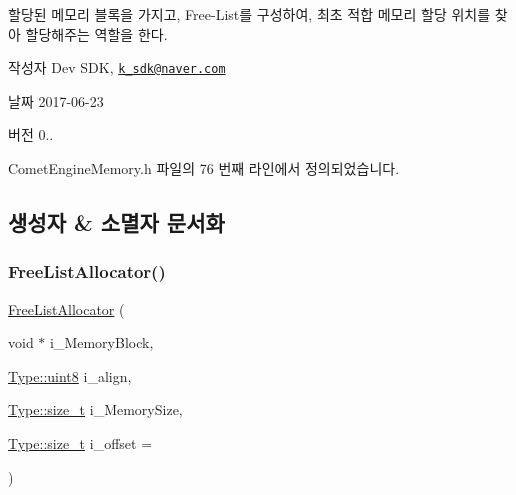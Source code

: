 할당된 메모리 블록을 가지고, Free-\/\+List를 구성하여, 최초 적합 메모리 할당 위치를 찾아 할당해주는 역할을 한다.

\begin{DoxyAuthor}{작성자}
Dev S\+DK, \href{mailto:k_sdk@naver.com}{\tt k\+\_\+sdk@naver.\+com} 
\end{DoxyAuthor}
\begin{DoxyDate}{날짜}
2017-\/06-\/23 
\end{DoxyDate}
\begin{DoxyVersion}{버전}
0.. 
\end{DoxyVersion}


Comet\+Engine\+Memory.\+h 파일의 76 번째 라인에서 정의되었습니다.



\subsection{생성자 \& 소멸자 문서화}
\mbox{\label{class_comet_engine_1_1_core_1_1_memory_1_1_free_list_allocator_ae13641cb77ff097ec23c1a6112b2e6c6}} 
\subsubsection{\texorpdfstring{Free\+List\+Allocator()}{FreeListAllocator()}}
{\footnotesize\ttfamily \hyperlink{class_comet_engine_1_1_core_1_1_memory_1_1_free_list_allocator}{Free\+List\+Allocator} (\begin{DoxyParamCaption}\item[{void $\ast$}]{i\+\_\+\+Memory\+Block,  }\item[{\hyperlink{namespace_comet_engine_1_1_type_a1b09856a6463f2bcc4bd8ff0e4e3ee0f}{Type\+::uint8}}]{i\+\_\+align,  }\item[{\hyperlink{namespace_comet_engine_1_1_type_a7c94ea6f8948649f8d181ae55911eeaf}{Type\+::size\+\_\+t}}]{i\+\_\+\+Memory\+Size,  }\item[{\hyperlink{namespace_comet_engine_1_1_type_a7c94ea6f8948649f8d181ae55911eeaf}{Type\+::size\+\_\+t}}]{i\+\_\+offset = {} }\end{DoxyParamCaption})}



